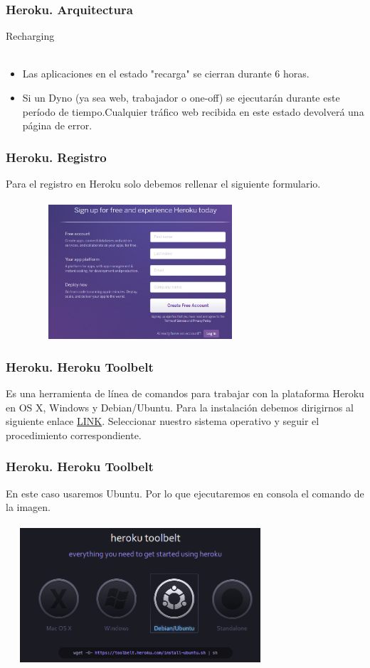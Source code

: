 \documentclass{beamer}
\begin{document}
\begin{frame}
	\frametitle{Heroku. Arquitectura}
	\centering Recharging\\ \ \\
	\begin{itemize}
		\item Las aplicaciones en el estado "recarga" se cierran durante 6 horas. 
		\item Si un Dyno (ya sea web, trabajador o one-off) se ejecutarán durante este período de tiempo.Cualquier tráfico web recibida en este estado devolverá una página de error.
	\end{itemize}
\end{frame}

\begin{frame}
\frametitle{Heroku. Registro}
Para el registro en Heroku solo debemos rellenar el siguiente formulario.\\ \ \\
\includegraphics[width=10cm, height=5cm]{githubHeroku/22.png}
\end{frame}

\begin{frame}
\frametitle{Heroku. Heroku Toolbelt}
Es una herramienta de línea de comandos para trabajar con la plataforma Heroku en OS X, Windows y Debian/Ubuntu. Para la instalación debemos dirigirnos al siguiente enlace \href{https://toolbelt.heroku.com}{LINK}. Seleccionar nuestro sistema operativo y seguir el procedimiento correspondiente.
\end{frame}

\begin{frame}
\frametitle{Heroku. Heroku Toolbelt}
En este caso usaremos Ubuntu. Por lo que ejecutaremos en consola el comando de la imagen.\\ \ \\
\includegraphics[width=10cm, height=5cm]{githubHeroku/23.png}
\end{frame}
\end{document}
